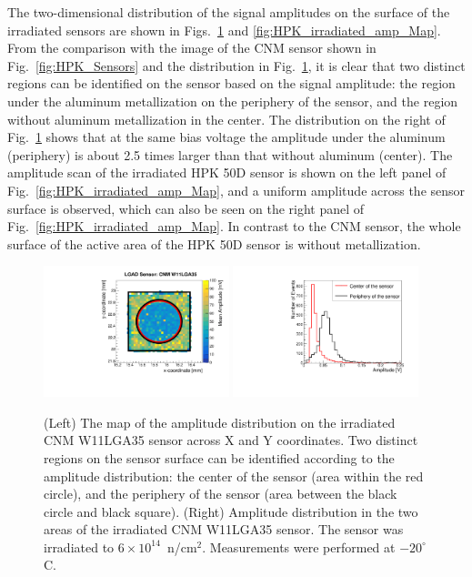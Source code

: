 \documentclass[preprint,1p]{elsarticle}
\begin{document}
The two-dimensional distribution of the signal amplitudes on the surface of the
irradiated sensors are shown in Figs.~\ref{fig:CNM_irradiated_amp_Map} and
\ref{fig:HPK_irradiated_amp_Map}. From the comparison with the image of the CNM
sensor shown in Fig.~\ref{fig:HPK_Sensors} and the distribution in
Fig.~\ref{fig:CNM_irradiated_amp_Map}, it is clear that two distinct regions can
be identified on the sensor based on the signal amplitude: the region under the
aluminum metallization on the periphery of the sensor, and the region without
aluminum metallization in the center. The distribution on the right of
Fig.~\ref{fig:CNM_irradiated_amp_Map} shows that at the same bias voltage the amplitude under the
aluminum (periphery) is about 2.5 times larger than that without aluminum
(center). The amplitude scan of the irradiated HPK 50D sensor is shown on the
left panel of Fig.~\ref{fig:HPK_irradiated_amp_Map}, and a uniform amplitude
across the sensor surface is observed, which can also be seen on the right panel
of Fig.~\ref{fig:HPK_irradiated_amp_Map}. In contrast to the CNM sensor, the
whole surface of the active area of the HPK 50D sensor is without metallization.


\begin{figure}[htbp] 
\centering
\includegraphics[width=0.48\textwidth]{figs/USCSBoard_HPK50DIrradiated-CNMW11LGA35_Run936-961/CNM_irradiated_amp_Map.pdf} \hfill
\includegraphics[width=0.48\textwidth]{figs/USCSBoard_HPK50DIrradiated-CNMW11LGA35_Run936-961/CNM_irradiated_amp_1D.pdf} 
\caption{(Left) The map of the amplitude distribution on the irradiated CNM W11LGA35 sensor across X and Y coordinates. Two distinct regions on the sensor surface can be identified according to the amplitude distribution: the center of the sensor (area within the red circle), and the periphery of the sensor (area between the black circle and black square). (Right) Amplitude distribution in the two areas of the irradiated CNM W11LGA35 sensor. The sensor was irradiated to $6\times 10^{14}$~n/cm$^2$. Measurements were performed at $-20^{\circ}$C.} 
\label{fig:CNM_irradiated_amp_Map} 
\end{figure} 
\end{document}
